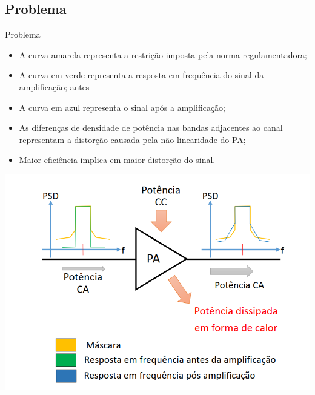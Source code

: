 \documentclass{if-beamer}
\begin{document}
\subsection{Problema}
\begin{frame}{Problema}

\begin{minipage}{.49\textwidth}

\begin{itemize}
    \item A curva amarela representa a restrição 
    imposta pela norma regulamentadora;
    \item A curva em verde representa a resposta em frequência do sinal da amplificação;
    antes 
    \item A curva em azul representa o sinal após a amplificação;
    \item As diferenças de densidade de potência nas bandas adjacentes ao canal representam a distorção causada pela não linearidade do PA;
    \item Maior eficiência implica em maior distorção do sinal.
\end{itemize}


\end{minipage}
\begin{minipage}{.49\textwidth}
	\includegraphics[scale=0.25]{normareg.png}
\end{minipage}

\end{frame}

\end{document}
